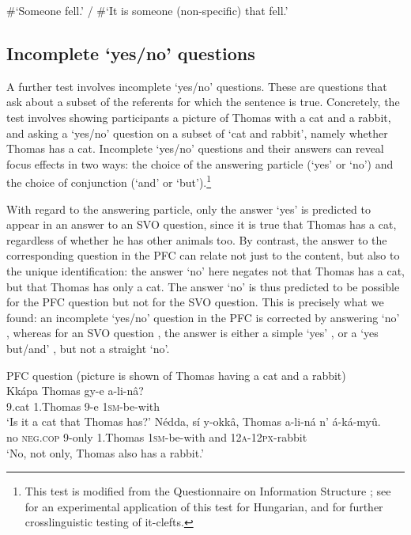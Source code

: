 \documentclass[output=paper]{langsci/langscibook}
\begin{document}
\glt     \#‘Someone fell.’ / \#‘It is someone (non-specific) that fell.’
\z
\z

\subsection{Incomplete ‘yes/no’ questions}\label{sec:vanderwal:3.3} %

A further test involves incomplete ‘yes/no’ questions. These are questions that ask about a subset of the referents for which the sentence is true. Concretely, the test involves showing participants a picture of Thomas with a cat and a rabbit, and asking a ‘yes/no’ question on a subset of ‘cat and rabbit’, namely whether Thomas has a cat. Incomplete ‘yes/no’ questions and their answers can reveal focus effects in two ways: the choice of the answering particle (‘yes’ or ‘no’) and the choice of conjunction (‘and’ or ‘but’).\footnote{This test is modified from the Questionnaire on Information Structure \citep{SkopeteasEtAl2006}; see \citet{OneaBeaver2011} for an experimental application of this test for Hungarian, and \citet{DestruelEtAl2015} for further crosslinguistic testing of it-clefts.}

  With regard to the answering particle, only the answer ‘yes’ is predicted to appear in an answer to an SVO question, since it is true that Thomas has a cat, regardless of whether he has other animals too. By contrast, the answer to the corresponding question in the PFC can relate not just to the content, but also to the unique identification: the answer ‘no’ here negates not that Thomas has a cat, but that Thomas has only a cat. The answer ‘no’ is thus predicted to be possible for the PFC question but not for the SVO question. This is precisely what we found: an incomplete ‘yes/no’ question in the PFC  is corrected by answering ‘no’ , whereas for an SVO question , the answer is either a simple ‘yes’ , or a ‘yes but/and’ , but not a straight ‘no’. 

\ea\label{ex:vanderwal:16}PFC question
       (picture is shown of Thomas having a cat and a rabbit)\\
\ea\label{ex:vanderwal:16a}
\gll     Kkápa  Thomas  gy-e  a-li-nâ?\\
         9.cat  1.Thomas  9-e  \textsc{1sm}-be-with\\
\glt     ‘Is it a cat that Thomas has?’
\ex\label{ex:vanderwal:16b}
\gll      Nédda,  sí    y-okkâ,  Thomas  a-li-ná    n’  á-ká-myû.\\
         no  \textsc{neg}.\textsc{cop}  9-only  1.Thomas  \textsc{1sm}-be-with  and  \textsc{12a}-\textsc{12px}-rabbit\\
\glt     ‘No, not only, Thomas also has a rabbit.’
\z
\z
\end{document}
